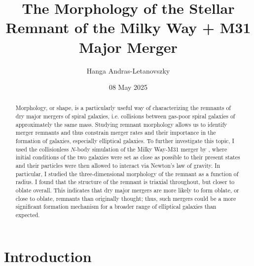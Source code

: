 \documentclass[twocolumn]{aastex631}
\begin{document}
\title{The Morphology of the Stellar Remnant of the Milky Way + M31 Major Merger}


\author{Hanga Andras-Letanovszky}

\date{08 May 2025}

\begin{abstract}

Morphology, or shape, is a particularly useful way of characterizing the remnants of dry major mergers of spiral galaxies, i.e. collisions between gas-poor spiral galaxies of approximately the same mass.
Studying remnant morphology allows us to identify merger remnants and thus constrain merger rates and their importance in the formation of galaxies, especially elliptical galaxies.
To further investigate this topic, I used the collisionless $N$-body simulation of the Milky Way-M31 merger by \cite{van_der_Marel+2012}, where initial conditions of the two galaxies were set as close as possible to their present states and their particles were then allowed to interact via Newton's law of gravity.
In particular, I studied the three-dimensional morphology of the remnant as a function of radius. 
I found that the structure of the remnant is triaxial throughout, but closer to oblate overall.
This indicates that dry major mergers are more likely to form oblate, or close to oblate, remnants than originally thought; thus, such mergers could be a more significant formation mechanism for a broader range of elliptical galaxies than expected.


\end{abstract}



\section{Introduction}
\end{document}
